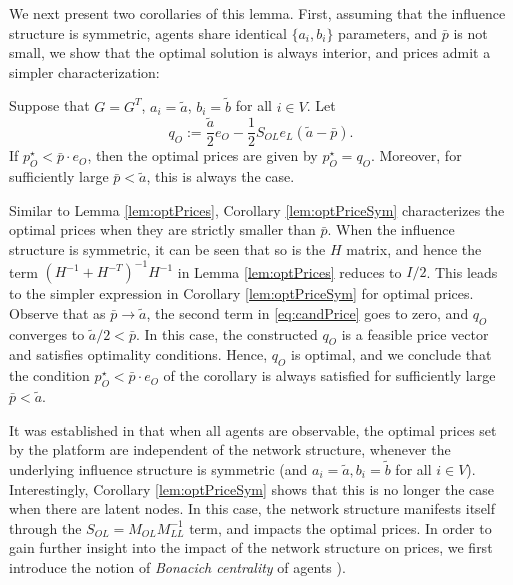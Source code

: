 \documentclass[opre,nonblindrev]{informs3} %
\begin{document}
We next present two corollaries of this lemma.
First, assuming that the influence structure is symmetric,
agents share identical $\{a_i,b_i\}$ parameters,
and $\bar p $ is not small, we
 show that the optimal solution is always interior, and prices  admit a  simpler characterization:
\begin{corollary}\label{lem:optPriceSym}
	Suppose that   $G=G^T$,
	$a_i=\tilde{a}$, $b_i=\tilde{b}$ for all $i\in V$. Let
	\begin{equation} \label{eq:candPrice}
	 {q}_O :=
	\frac{\tilde{a}}{2}{e}_O-\frac{1}{2} S_{OL} {e}_L(\tilde{a}-\bar{p}).
	\end{equation}
	If ${p}_O^\star < \bar p \cdot{e}_O$,
	then  the optimal prices are given by ${p}_O^\star= {q}_O$. Moreover,  for sufficiently large
	$\bar p<\tilde{a}$, this is always the case.
\end{corollary}
Similar to Lemma \ref{lem:optPrices},
Corollary \ref{lem:optPriceSym} characterizes the optimal prices when they are strictly smaller than $\bar p$.
When the influence structure is symmetric, it can be seen that so is the $H$ matrix, and hence the term
$(H^{-1}+H^{-T})^{-1} H^{-1}$ in Lemma \ref{lem:optPrices} reduces to $I/2$. This leads to the simpler expression in Corollary \ref{lem:optPriceSym} for optimal prices.
Observe that as $\bar p \rightarrow \tilde a$, the second term in \eqref{eq:candPrice} goes to zero, and ${q}_O$ converges to $\tilde a/2 <\bar p$.
In this case, the constructed
${q}_O$ is  a feasible price vector and satisfies optimality conditions.
Hence,   ${q}_O$ is optimal, and
 we conclude that
 the condition ${p}_O^\star < \bar p \cdot {e}_O$ of the corollary
is always satisfied for  sufficiently large $\bar p <\tilde a$. 

  
It was established in \citet{candogan2012optimal} that
when all agents are observable, the optimal prices set by the platform are independent of the network structure, whenever the underlying influence structure is symmetric (and $a_i=\tilde a, b_i=\tilde b$ for all $i\in V$). Interestingly,
Corollary \ref{lem:optPriceSym} shows that this is no longer the case when there are latent nodes.
In this case, the network structure  manifests itself
through the $S_{OL}=M_{OL}M^{-1}_{LL}$ term, and impacts the optimal prices. In order to gain further insight into the impact of the network structure on prices, we first introduce the notion of \emph{Bonacich centrality} of agents 
\citep[see][]{ballester2006s,candogan2012optimal}).
\end{document}
